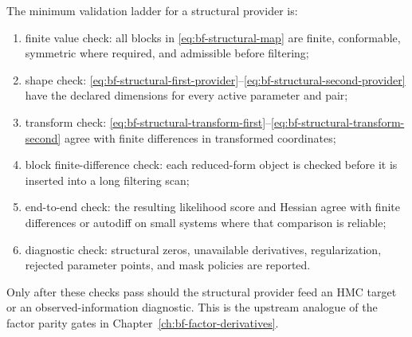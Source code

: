 The minimum validation ladder for a structural provider is:
\begin{enumerate}[label=(\roman*)]
  \item finite value check: all blocks in \eqref{eq:bf-structural-map} are finite,
    conformable, symmetric where required, and admissible before filtering;
  \item shape check:
    \eqref{eq:bf-structural-first-provider}--\eqref{eq:bf-structural-second-provider}
    have the declared dimensions for every active parameter and pair;
  \item transform check:
    \eqref{eq:bf-structural-transform-first}--\eqref{eq:bf-structural-transform-second}
    agree with finite differences in transformed coordinates;
  \item block finite-difference check: each reduced-form object is checked
    before it is inserted into a long filtering scan;
  \item end-to-end check: the resulting likelihood score and Hessian agree with
    finite differences or autodiff on small systems where that comparison is
    reliable;
  \item diagnostic check: structural zeros, unavailable derivatives,
    regularization, rejected parameter points, and mask policies are reported.
\end{enumerate}
Only after these checks pass should the structural provider feed an HMC target
or an observed-information diagnostic.  This is the upstream analogue of the
factor parity gates in Chapter~\ref{ch:bf-factor-derivatives}.
